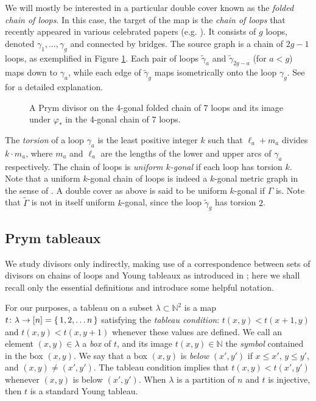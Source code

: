 \documentclass[11pt,reqno]{amsart}
\newcommand*{\N}{\mathbb{N}}
\newcommand*{\maps}{\nobreak\mskip2mu\mathpunct{}\nonscript
  \mkern-\thinmuskip{:}\mskip6muplus1mu\relax}
\newcommand*{\ti}[1]{\tilde{#1}}
\newcommand*{\wti}[1]{\widetilde{#1}}
\theoremstyle{definition}
\theoremstyle{problem}
\theoremstyle{plain}
\theoremstyle{remark}
\theoremstyle{theorem}
\numberwithin{equation}{section}
\numberwithin{figure}{section}
\theoremstyle{definition}
\theoremstyle{problem}
\theoremstyle{plain}
\begin{document}
We will mostly be interested in a particular double cover known as the
\emph{folded chain of loops}. In this case, the target of the map is
the \emph{chain of loops} that recently appeared in various celebrated
papers (e.g. \cite{MRC, Pflueger, JR}). It consists of $g$ loops,
denoted  $\gamma_1,\ldots,\gamma_g$ and connected by bridges. The
source graph is a chain of $2g-1$ loops, as exemplified in Figure
\ref{fig:2}.  Each pair of loops $\ti\gamma_a$ and $\ti\gamma_{2g-a}$
(for $a<g$) maps down to $\gamma_a$, while each edge of $\ti\gamma_g$
maps isometrically onto the loop $\gamma_g$.  See \cite[Section
5.2]{len2019skeletons} for a detailed explanation.

\begin{figure}[H]
  \centering
  
  \caption{A Prym divisor on the 4-gonal folded chain of 7 loops and
    its image under $\varphi_{*}$ in the 4-gonal chain of 7 loops.}
  \label{fig:2}
\end{figure}

The \textit{torsion} of a loop $\gamma_a$ is the least positive
integer $k$ such that $\ell_a+m_a$ divides $k\cdot m_a$, where $m_a$
and $\ell_a$ are the lengths of the lower and upper arcs of $\gamma_a$
respectively.  The chain of loops is \emph{uniform $k$-gonal} if each
loop has torsion $k$. Note that a uniform $k$-gonal chain of loops is
indeed a $k$-gonal metric graph in the sense of \cite[Section
1.3.2]{ABBR152}.  A double cover as above is said to be uniform
$k$-gonal if $\Gamma$ is.  Note that $\wti\Gamma$ is not in itself
uniform $k$-gonal, since the loop $\ti\gamma_g$ has torsion $2$.

\subsection{Prym tableaux}
We study divisors only indirectly, making use of a correspondence
between sets of divisors on chains of loops and Young tableaux as
introduced in \cite{Pflueger, len2019skeletons}; here we shall recall
only the essential definitions and introduce some helpful notation.

For our purposes, a tableau on a subset $\lambda \subset \N^2$ is a map
$t \maps \lambda \to [n] = \set{1,2,\ldots n}$ satisfying the
\textit{tableau condition}: $t(x,y) < t(x+1,y)$ and
$t(x,y) < t(x,y+1)$ whenever these values are defined. We call an element $(x,y) \in \lambda$ a \emph{box} of $t$, and its image $t(x,y) \in \N$ the \emph{symbol} contained in the box $(x,y)$. We say
that a box $(x,y)$ is \textit{below} $(x',y')$ if $x \leq x'$,
$y \leq y'$, and $(x,y) \neq (x',y')$.   The tableau condition implies that $t(x,y)<t(x',y')$ whenever $(x,y)$ is below $(x',y')$.  When $\lambda$ is a partition of $n$ and $t$ is injective, then $t$ is a standard Young tableau.
\end{document}
